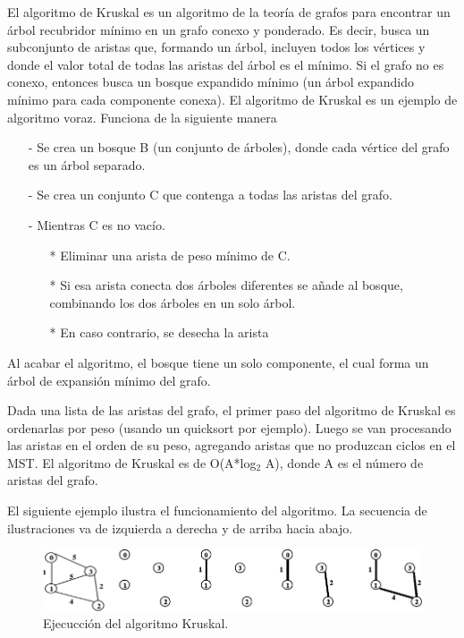 El algoritmo de Kruskal es un algoritmo de la teoría de grafos para encontrar un árbol recubridor mínimo en un grafo conexo y ponderado. Es decir, busca un subconjunto de aristas que, formando un árbol, incluyen todos los vértices y donde el valor total de todas las aristas del árbol es el mínimo. Si el grafo no es conexo, entonces busca un bosque expandido mínimo (un árbol expandido mínimo para cada componente conexa). El algoritmo de Kruskal es un ejemplo de algoritmo voraz. Funciona de la siguiente manera

\begin{itemize}
	\item[-] Se crea un bosque B (un conjunto de árboles), donde cada vértice del grafo es un árbol separado.
	\item[-] Se crea un conjunto C que contenga a todas las aristas del grafo.
	\item[-] Mientras C es no vacío.
	\begin{itemize}
		\item[*] Eliminar una arista de peso mínimo de C.
		\item[*] Si esa arista conecta dos árboles diferentes se añade al bosque, combinando los dos árboles en un solo árbol.
		\item[*] En caso contrario, se desecha la arista
	\end{itemize}
\end{itemize}
Al acabar el algoritmo, el bosque tiene un solo componente, el cual forma un árbol de expansión mínimo del grafo.

Dada una lista de las aristas del grafo, el primer paso del algoritmo de Kruskal es ordenarlas por peso (usando un quicksort por ejemplo). Luego se van procesando las aristas en el orden de su peso, agregando aristas que no produzcan ciclos en el MST. El algoritmo de Kruskal es de O(A*log$_{ 2}$ A), donde A es el número de aristas del grafo.

El siguiente ejemplo ilustra el funcionamiento del algoritmo. La secuencia de ilustraciones va de izquierda a derecha y de arriba hacia abajo.

\begin{figure}[h]
	\centering 
	\includegraphics[scale=0.4]{img/kruskal}
	\caption{Ejecucción del algoritmo Kruskal.}
	\label{contexto:figura2}
\end{figure}

